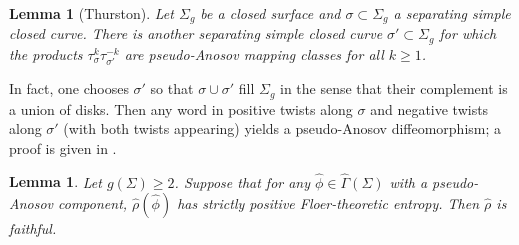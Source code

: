 \documentclass[reqno,10pt]{amsart}
\numberwithin{equation}{section}
\newtheorem{Lemma}[thm]{Lemma}
\theoremstyle{remark}
\begin{document}
\begin{Lemma}[Thurston] \label{Lem:BuildPseudoAnosov}
Let $\Sigma_g$ be a closed surface and $\sigma \subset \Sigma_g$ a separating simple closed curve. There is another separating simple closed curve $\sigma' \subset \Sigma_g$ for which the products $\tau_{\sigma}^k \tau_{\sigma'}^{-k}$ are pseudo-Anosov mapping classes for all $k\geq 1$.
\end{Lemma}


In fact, one chooses $\sigma'$ so that $\sigma \cup \sigma'$ fill $\Sigma_g$ in the sense that their complement is a union of disks. Then any word in positive twists along $\sigma$ and negative twists along $\sigma'$ (with both twists appearing)  yields a pseudo-Anosov diffeomorphism; a proof is given in  \cite[Expos\'e 13, Th\'eor\`eme III.3]{FLP}.


\begin{Lemma} \label{Lem:EntropyCriterion}
Let $g(\Sigma)\geq 2$.  Suppose that for any  $\hat\phi \in \widehat\Gamma(\Sigma)$  with a  pseudo-Anosov component, $\hat\rho(\hat\phi)$  has strictly positive Floer-theoretic entropy.   Then $\hat{\rho}$ is faithful.
\end{Lemma}
\end{document}
